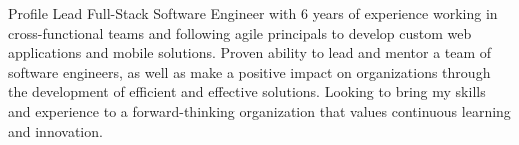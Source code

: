 \begin{basicSection}{Profile}
    Lead Full-Stack Software Engineer with 6 years of experience working in cross-functional teams and following agile principals to develop custom web applications and mobile solutions.
    Proven ability to lead and mentor a team of software engineers, as well as make a positive impact on organizations through the development of efficient and effective solutions.
    Looking to bring my skills and experience to a forward-thinking organization that values continuous learning and innovation.
\end{basicSection}